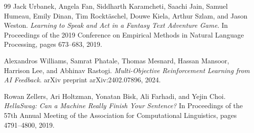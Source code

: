 \documentclass[11pt]{article}
\begin{document}
\begin{thebibliography}{99}
Jack Urbanek, Angela Fan, Siddharth Karamcheti, Saachi Jain, Samuel Humeau, Emily Dinan, Tim Rockt\"aschel, Douwe Kiela, Arthur Szlam, and Jason Weston.
\textit{Learning to Speak and Act in a Fantasy Text Adventure Game}.
In Proceedings of the 2019 Conference on Empirical Methods in Natural Language Processing, pages 673--683, 2019.

Alexandros Williams, Samrat Phatale, Thomas Mesnard, Hassan Mansoor, Harrison Lee, and Abhinav Rastogi.
\textit{Multi-Objective Reinforcement Learning from AI Feedback}.
arXiv preprint arXiv:2402.07896, 2024.

Rowan Zellers, Ari Holtzman, Yonatan Bisk, Ali Farhadi, and Yejin Choi.
\textit{HellaSwag: Can a Machine Really Finish Your Sentence?}
In Proceedings of the 57th Annual Meeting of the Association for Computational Linguistics, pages 4791--4800, 2019.

\end{thebibliography}
\end{document}
